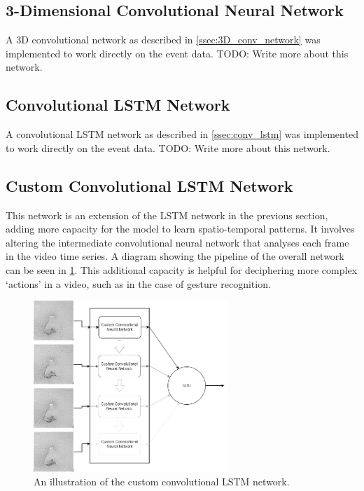 \subsection{3-Dimensional Convolutional Neural Network} \label{ssec:conv_3d_network_design}

A 3D convolutional network as described in \cref{ssec:3D_conv_network} was implemented to work directly on the event data. \color{red} TODO: Write more about this network. \color{black}

\subsection{Convolutional LSTM Network}

A convolutional LSTM network as described in \cref{ssec:conv_lstm} was implemented to work directly on the event data. \color{red} TODO: Write more about this network. \color{black}

\subsection{Custom Convolutional LSTM Network}

This network is an extension of the LSTM network in the previous section, adding more capacity for the model to learn spatio-temporal patterns. It involves altering the intermediate convolutional neural network that analyses each frame in the video time series. A diagram showing the pipeline of the overall network can be seen in \cref{fig:custom_conv_lstm_pipeline}. This additional capacity is helpful for deciphering more complex `actions' in a video, such as in the case of gesture recognition.

\begin{figure}[htb]
    \centering
    \includegraphics[width=0.65\textwidth]{analysisanddesign/images/custom_conv_lstm_pipeline.png}
    \caption{An illustration of the custom convolutional LSTM network.}
    \label{fig:custom_conv_lstm_pipeline}
\end{figure}

